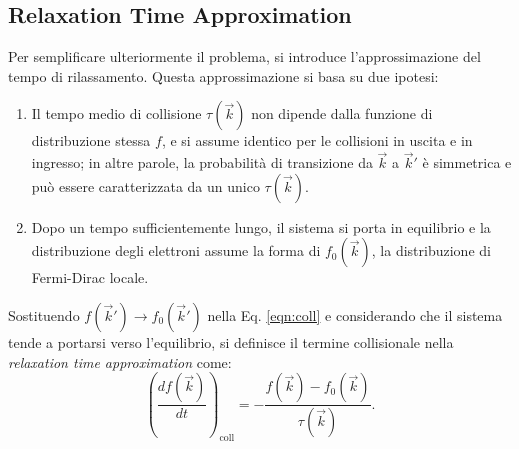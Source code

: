 \subsection{Relaxation Time Approximation}
Per semplificare ulteriormente il problema, si introduce l'approssimazione del tempo di rilassamento. Questa approssimazione si basa su due ipotesi:
\begin{enumerate}
    \item Il tempo medio di collisione \(\tau(\vec{k})\) non dipende dalla funzione di distribuzione stessa $f$, e si assume identico per le collisioni in uscita e in ingresso; in altre parole, la probabilità di transizione da \(\vec{k}\) a \(\vec{k}'\) è simmetrica e può essere caratterizzata da un unico \(\tau(\vec{k})\).
    \item Dopo un tempo sufficientemente lungo, il sistema si porta in equilibrio e la distribuzione degli elettroni assume la forma di \(f_0(\vec{k})\), la distribuzione di Fermi-Dirac locale.
\end{enumerate}
Sostituendo \(f(\vec{k}') \to f_0(\vec{k}')\) nella Eq. \eqref{eqn:coll} e considerando che il sistema tende a portarsi verso l'equilibrio, si definisce il termine collisionale nella \emph{relaxation time approximation} come:
\[
\left(\frac{df(\vec{k})}{dt}\right)_{\text{coll}} = -\frac{f(\vec{k})-f_0(\vec{k})}{\tau(\vec{k})}.
\]

